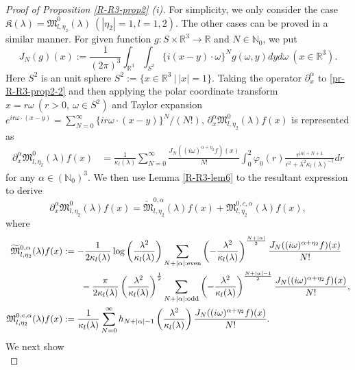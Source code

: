 \documentclass[dvipdfmx,12pt]{article}
\begin{document}
\begin{proof}[Proof of Proposition \ref{R-R3-prop2} {\rm (i)}]
For simplicity, we only consider the case $\mathfrak{K}(\lambda)=\mathfrak{M}_{l,\eta_2}^0(\lambda)~(|\eta_2|=1,l=1,2)$. The other cases can be proved in a similar manner. For given function $g: S\times\mathbb{R}^3\to \mathbb{R}$ and $N\in\mathbb{N}_0$, we put 
\[
J_N(g)(x):=\frac{1}{(2\pi)^3}\int_{\mathbb{R}^3} \int_{S^2} \{i(x-y)\cdot \omega\}^N g(\omega,y)dyd\omega~(x\in \mathbb{R}^3).
\] 
 Here $S^2$ is an unit sphere $S^2:=\{x\in\mathbb{R}^3~|~|x|=1\}$.
Taking the operator $\partial_x^{\alpha}$ to \eqref{pr-R-R3-prop2-2} and then applying the polar coordinate transform $x=r\omega~(r>0,~\omega\in S^2)$ and Taylor expansion $e^{ir\omega\cdot (x-y)}=\sum_{N=0}^\infty \{i r \omega\cdot (x-y)\}^N/(N !)$, $\partial_x^{\alpha} \mathfrak{M}_{l,\eta_2}^0(\lambda)f(x)$ is represented as
\begin{align*}
\partial_x^{\alpha} \mathfrak{M}_{l,\eta_2}^0(\lambda)f(x)&=\frac{1}{\kappa_l(\lambda)}\sum_{N=0}^{\infty} \frac{J_N((i\omega)^{\alpha+\eta_2} f)(x)}{N !} \int_0^2 \varphi_0(r) \frac{r^{|\alpha|+N +1 } }{r^2+\lambda^2\kappa_l(\lambda)^{-1} } dr
\end{align*}
for any  $\alpha\in (\mathbb{N}_0)^3$.
We then use Lemma \ref{R-R3-lem6} to the resultant expression to derive
\begin{equation*}%
\partial_x^{\alpha} \mathfrak{M}_{l,\eta_2}^0(\lambda) f(x)  = \widetilde{\mathfrak{M} }_{l,\eta_2}^{0,\alpha}(\lambda) f(x) +\mathfrak{M}_{l,\eta_2}^{0,c,\alpha}(\lambda) f(x),
\end{equation*}
where 
\begin{align*}
\widetilde{\mathfrak{M} }_{l,\eta_2}^{0,\alpha}(\lambda)f(x)&:=-\frac{1}{2\kappa_l(\lambda)}\log \left(\frac{\lambda^2}{\kappa_l(\lambda)} \right)\sum_{N+|\alpha|: {\rm even}}  \left(-\frac{\lambda^2}{\kappa_l(\lambda)} \right)^{\frac{N+|\alpha|}{2} }\frac{J_N( (i\omega)^{\alpha+\eta_2}  f)(x)}{N !} \\
&\qquad -\frac{\pi}{2\kappa_l(\lambda)}\left(\frac{\lambda^2}{\kappa_l(\lambda)} \right)^{\frac{1}{2} }\sum_{N+|\alpha|: {\rm odd}}  \left(-\frac{\lambda^2}{\kappa_l(\lambda)} \right)^{\frac{N+|\alpha|-1}{2} }\frac{J_N( (i\omega)^{\alpha+\eta_2}  f)(x)}{N !}, \\
\mathfrak{M}_{l,\eta_2}^{0,c,\alpha}(\lambda)f(x)&:=\frac{1}{\kappa_l(\lambda)}\sum_{N=0}^\infty h_{N+|\alpha|-1}\left(\frac{\lambda^2}{\kappa_l(\lambda)} \right)\frac{J_N( (i\omega)^{\alpha+\eta_2}  f)(x)}{N !}.
\end{align*}
We next show 
\begin{equation}\label{pr-R-R3-prop2-7}

\end{equation}
\end{proof}
\end{document}
